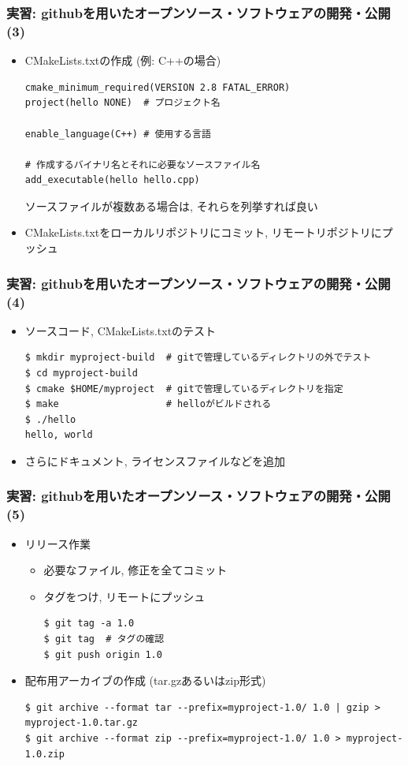 \begin{frame}[t,fragile]
  \frametitle{実習: githubを用いたオープンソース・ソフトウェアの開発・公開(3)}
  \begin{itemize}
  \item CMakeLists.txtの作成 (例: C++の場合)
\begin{lstlisting}
cmake_minimum_required(VERSION 2.8 FATAL_ERROR)
project(hello NONE)  # プロジェクト名

enable_language(C++) # 使用する言語

# 作成するバイナリ名とそれに必要なソースファイル名
add_executable(hello hello.cpp)
\end{lstlisting}
  ソースファイルが複数ある場合は, それらを列挙すれば良い \\[0.5em]
  \item CMakeLists.txtをローカルリポジトリにコミット, リモートリポジトリにプッシュ
  \end{itemize}
\end{frame}

\begin{frame}[t,fragile]
  \frametitle{実習: githubを用いたオープンソース・ソフトウェアの開発・公開(4)}
  \begin{itemize}
  \item ソースコード, CMakeLists.txtのテスト
\begin{lstlisting}
$ mkdir myproject-build  # gitで管理しているディレクトリの外でテスト
$ cd myproject-build
$ cmake $HOME/myproject  # gitで管理しているディレクトリを指定
$ make                   # helloがビルドされる
$ ./hello
hello, world
\end{lstlisting}
  \item さらにドキュメント, ライセンスファイルなどを追加
  \end{itemize}
\end{frame}

\begin{frame}[t,fragile]
  \frametitle{実習: githubを用いたオープンソース・ソフトウェアの開発・公開(5)}
  \begin{itemize}
  \item リリース作業
    \begin{itemize}
    \item 必要なファイル, 修正を全てコミット
    \item タグをつけ, リモートにプッシュ
\begin{lstlisting}
$ git tag -a 1.0
$ git tag  # タグの確認
$ git push origin 1.0
\end{lstlisting}
    \end{itemize}
  \item 配布用アーカイブの作成 (tar.gzあるいはzip形式)
\begin{lstlisting}
$ git archive --format tar --prefix=myproject-1.0/ 1.0 | gzip > myproject-1.0.tar.gz
$ git archive --format zip --prefix=myproject-1.0/ 1.0 > myproject-1.0.zip
\end{lstlisting}
  \end{itemize}
\end{frame}

